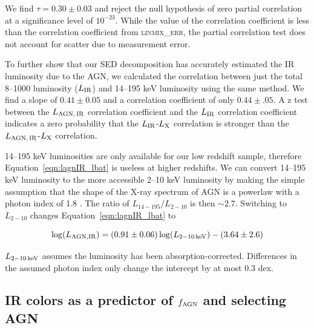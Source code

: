 \documentclass[fleqn, usenatbib]{mnras}
\begin{document}
We find $\tau = 0.30\pm0.03$ and reject the null hypothesis of zero partial correlation at a significance level of $10^{-23}$. While the value of the correlation coefficient is less than the correlation coefficient from \textsc{linmix\_err}, the partial correlation test does not account for scatter due to measurement error. 

To further show that our SED decomposition has accurately estimated the IR luminosity due to the AGN, we calculated the correlation between just the total 8--1000 \micron{} luminosity ($L_{\rm IR}$) and 14--195 keV luminosity using the same method. We find a slope of $0.41\pm0.05$ and a correlation coefficient of only $0.44\pm.05$. A z test between the $L_{\rm AGN,\,IR}$ correlation coefficient and the $L_{\rm IR}$ correlation coefficient indicates a zero probability that the $L_{\rm IR}$-$L_{\rm X}$ correlation is stronger than the $L_{\rm AGN,\,IR}$-$L_{\rm X}$ correlation. 

14--195 keV luminosities are only available for our low redshift sample, therefore Equation~\ref{eqn:lagnIR_lbat} is useless at higher redshifts. We can convert 14--195 keV luminosity to the more accessible 2--10 keV luminosity by making the simple assumption that the shape of the X-ray spectrum of AGN is a powerlaw with a photon index of 1.8 \citep[e.g.][]{Vasudevan:2013dz}. The ratio of $L_{14-195}/L_{2-10}$ is then $\sim2.7$. Switching to $L_{2-10}$ changes Equation~\ref{eqn:lagnIR_lbat} to 

\begin{equation}\label{eqn:lagnIR_2_10}
\log(L_{\rm AGN,IR}) =  (0.91\pm0.06)\log(L_{\rm 2-10\,keV}) - (3.64\pm2.6)
\end{equation}

\noindent $L_{\rm 2-10\,keV}$ assumes the luminosity has been absorption-corrected. Differences in the assumed photon index only change the intercept by at most 0.3 dex. 

\subsection{IR colors as a predictor of $f_{\rm AGN}$ and selecting AGN}
\end{document}

